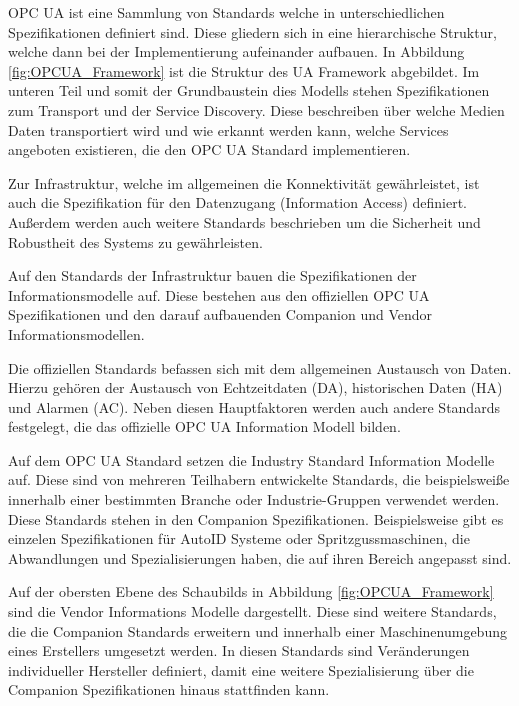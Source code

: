 \documentclass[a4paper, 12pt, oneside]{scrbook}
\begin{document}
		OPC UA ist eine Sammlung von Standards welche in unterschiedlichen Spezifikationen definiert sind. Diese gliedern sich in eine hierarchische Struktur, welche dann bei der Implementierung aufeinander aufbauen. In Abbildung \ref{fig:OPCUA_Framework} ist die Struktur des UA Framework abgebildet. Im unteren Teil und somit der Grundbaustein dies Modells stehen Spezifikationen zum Transport und der Service Discovery. Diese beschreiben über welche Medien Daten transportiert wird und wie erkannt werden kann, welche Services angeboten existieren, die den OPC UA Standard implementieren.
		
		Zur Infrastruktur, welche im allgemeinen die Konnektivität gewährleistet, ist auch die Spezifikation für den Datenzugang (Information Access) definiert. Außerdem werden auch weitere Standards beschrieben um die Sicherheit und Robustheit des Systems zu gewährleisten.
		
		Auf den Standards der Infrastruktur bauen die Spezifikationen der Informationsmodelle auf. Diese bestehen aus den offiziellen OPC UA Spezifikationen und den darauf aufbauenden Companion und Vendor Informationsmodellen. 
		
		Die offiziellen Standards befassen sich mit dem allgemeinen Austausch von Daten. Hierzu gehören der Austausch von Echtzeitdaten (DA), historischen Daten (HA) und Alarmen (AC). Neben diesen Hauptfaktoren werden auch andere Standards festgelegt, die das offizielle OPC UA Information Modell bilden. 
		
		Auf dem OPC UA Standard setzen die Industry Standard Information Modelle auf. Diese sind von mehreren Teilhabern entwickelte Standards, die beispielsweiße innerhalb einer bestimmten Branche oder Industrie-Gruppen verwendet werden. Diese Standards stehen in den Companion Spezifikationen. Beispielsweise gibt es einzelen Spezifikationen für AutoID Systeme oder Spritzgussmaschinen, die Abwandlungen und Spezialisierungen haben, die auf ihren Bereich angepasst sind.
		
		Auf der obersten Ebene des Schaubilds in Abbildung \ref{fig:OPCUA_Framework} sind die Vendor Informations Modelle dargestellt. Diese sind weitere Standards, die die Companion Standards erweitern und innerhalb einer Maschinenumgebung eines Erstellers umgesetzt werden. In diesen Standards sind Veränderungen individueller Hersteller definiert, damit eine weitere Spezialisierung über die Companion Spezifikationen hinaus stattfinden kann.
		
\end{document}
